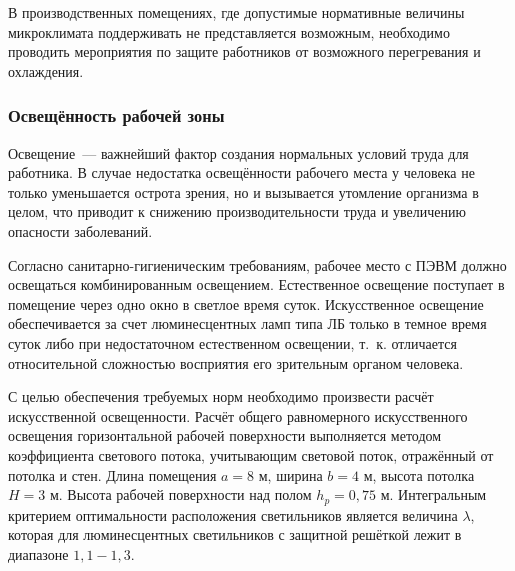 В производственных помещениях, где допустимые нормативные величины микроклимата поддерживать не представляется возможным, необходимо проводить мероприятия по защите работников от возможного перегревания и охлаждения. 



\subsubsection{Освещённость рабочей зоны}

Освещение~--- важнейший фактор создания нормальных условий труда для работника. 
В случае недостатка освещённости рабочего места у человека не только уменьшается острота зрения, но и вызывается утомление организма в целом, что приводит к снижению производительности труда и увеличению опасности заболеваний.

Согласно санитарно-гигиеническим требованиям, рабочее место с ПЭВМ должно освещаться комбинированным освещением. 
Естественное освещение поступает в помещение через одно окно в светлое время суток. 
Искусственное освещение обеспечивается за счет люминесцентных ламп типа ЛБ только в темное время суток либо при недостаточном естественном освещении, т.~к. отличается относительной сложностью восприятия его зрительным органом человека.

С целью обеспечения требуемых норм необходимо произвести расчёт искусственной освещенности.
Расчёт общего равномерного искусственного освещения горизонтальной рабочей поверхности выполняется методом коэффициента светового потока, учитывающим световой поток, отражённый от потолка и стен. Длина помещения $a = 8$ м, ширина $b = 4$ м, высота потолка $H = 3$ м. Высота рабочей поверхности над полом $h_p = 0,75$ м. Интегральным критерием оптимальности расположения светильников является величина $\lambda$, которая для люминесцентных светильников с защитной решёткой лежит в диапазоне $1,1 - 1,3$.

